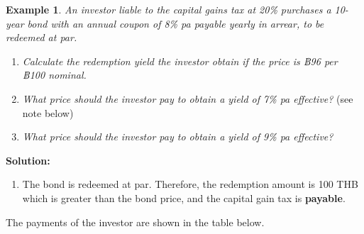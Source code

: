 \documentclass[
]{book}
\providecommand{\tightlist}{%
  \setlength{\itemsep}{0pt}\setlength{\parskip}{0pt}}
\theoremstyle{definition}
\theoremstyle{definition}
\newtheorem{example}{Example}[chapter]
\theoremstyle{definition}
\theoremstyle{definition}
\theoremstyle{remark}
\begin{document}
\begin{example}

\emph{An investor liable to the capital gains tax at 20\% purchases a 10-year
bond with an annual coupon of 8\% pa payable yearly in arrear, to be
redeemed at par.}

\begin{enumerate}
\def\labelenumi{\arabic{enumi}.}
\item
  \emph{Calculate the redemption yield the investor obtain if the price is
  ฿96 per ฿100 nominal.}
\item
  \emph{What price should the investor pay to obtain a yield of 7\% pa
  effective?} (see note below)
\item
  \emph{What price should the investor pay to obtain a yield of 9\% pa
  effective?}\\
\end{enumerate}

\end{example}

\textbf{Solution:}

\begin{enumerate}
\def\labelenumi{\arabic{enumi}.}
\tightlist
\item
  The bond is redeemed at par. Therefore, the redemption amount is 100
  THB which is greater than the bond price, and the capital gain tax
  is \textbf{payable}.
\end{enumerate}

The payments of the investor are shown in the table below.
\end{document}
